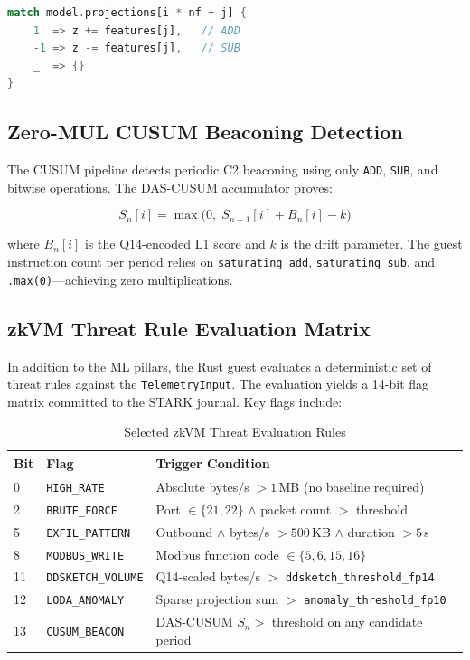 \documentclass[12pt,a4paper]{article}
\begin{document}
\begin{lstlisting}[language=Rust,caption={LODA zero-MUL projection}]
match model.projections[i * nf + j] {
    1  => z += features[j],   // ADD
    -1 => z -= features[j],   // SUB
    _  => {}
}
\end{lstlisting}

\subsection{Zero-MUL CUSUM Beaconing Detection}

The CUSUM pipeline detects periodic C2 beaconing using only \texttt{ADD},
\texttt{SUB}, and bitwise operations. The DAS-CUSUM accumulator proves:

\begin{equation}
  S_n[i] = \max\!\big(0,\; S_{n-1}[i] + B_n[i] - k\big)
\end{equation}

where $B_n[i]$ is the Q14-encoded L1 score and $k$ is the drift parameter.
The guest instruction count per period relies on \texttt{saturating\_add},
\texttt{saturating\_sub}, and \texttt{.max(0)}---achieving zero multiplications.

\subsection{zkVM Threat Rule Evaluation Matrix}

In addition to the ML pillars, the Rust guest evaluates a deterministic set of threat rules against the \texttt{TelemetryInput}. The evaluation yields a 14-bit flag matrix committed to the STARK journal. Key flags include:

\begin{table}[htbp]
\centering
\caption{Selected zkVM Threat Evaluation Rules}
\label{tab:threat_rules}
\begin{tabular}{@{}llp{8cm}@{}}
\toprule
\textbf{Bit} & \textbf{Flag} & \textbf{Trigger Condition} \\
\midrule
0  & \texttt{HIGH\_RATE} & Absolute bytes/s $> 1$\,MB (no baseline required) \\
2  & \texttt{BRUTE\_FORCE} & Port $\in \{21, 22\}$ $\wedge$ packet count $>$ threshold \\
5  & \texttt{EXFIL\_PATTERN} & Outbound $\wedge$ bytes/s $> 500$\,KB $\wedge$ duration $> 5$\,s \\
8  & \texttt{MODBUS\_WRITE} & Modbus function code $\in \{5, 6, 15, 16\}$ \\
11 & \texttt{DDSKETCH\_VOLUME} & Q14-scaled bytes/s $>$ \texttt{ddsketch\_threshold\_fp14} \\
12 & \texttt{LODA\_ANOMALY} & Sparse projection sum $>$ \texttt{anomaly\_threshold\_fp10} \\
13 & \texttt{CUSUM\_BEACON} & DAS-CUSUM $S_n >$ threshold on any candidate period \\
\bottomrule
\end{tabular}
\end{table}
\end{document}
